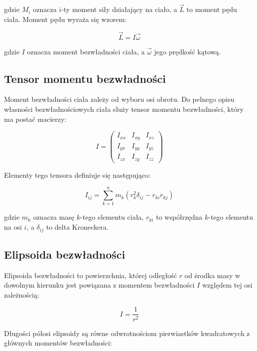 \documentclass[a4paper,12pt]{article}
\begin{document}
gdzie $M_i$ oznacza $i$-ty moment siły działający na ciało, a $\vec{L}$ to moment pędu ciała. Moment pędu wyraża się wzorem:

\begin{equation*}
    \vec{L} = I\vec{\omega}
\end{equation*}

gdzie $I$ oznacza moment bezwładności ciała, a $\vec{\omega}$ jego prędkość kątową.

\subsection*{Tensor momentu bezwładności}

Moment bezwładności ciała zależy od wyboru osi obrotu. Do pełnego opisu własności bezwładnościowych ciała służy tensor momentu bezwładności, który ma postać macierzy:

\begin{equation*}
    I = \begin{pmatrix}
        I_{xx} & I_{xy} & I_{xz} \\
        I_{yx} & I_{yy} & I_{yz} \\
        I_{zx} & I_{zy} & I_{zz}
    \end{pmatrix}
\end{equation*}

Elementy tego tensora definiuje się następująco:

\begin{equation*}
    I_{ij} = \sum_{k=1}^{n} m_k (r_{k}^2\delta_{ij} - r_{ki}r_{kj})
\end{equation*}

gdzie $m_k$ oznacza masę $k$-tego elementu ciała, $r_{ki}$ to współrzędna $k$-tego elementu na osi $i$, a $\delta_{ij}$ to delta Kroneckera.

\subsection*{Elipsoida bezwładności}

Elipsoida bezwładności to powierzchnia, której odległość $r$ od środka masy w dowolnym kierunku jest powiązana z momentem bezwładności $I$ względem tej osi zależnością:

\begin{equation*}
    I = \frac{1}{r^2}
\end{equation*}

Długości półosi elipsoidy są równe odwrotnościom pierwiastków kwadratowych z głównych momentów bezwładności:
\end{document}
